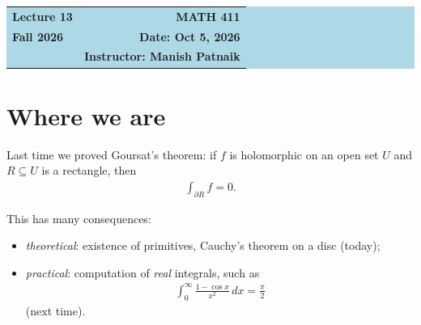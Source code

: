 \documentclass[11pt]{article}
\theoremstyle{plain}
\theoremstyle{definition}
\theoremstyle{remark}
\numberwithin{equation}{section}
\newcommand{\be}{\begin{eqnarray}}
\newcommand{\ee}{\end{eqnarray}}
\begin{document}
\begin{center}
  \colorbox{lightblue}{%
    \begin{minipage}{0.94\textwidth}
      \vspace{0.55em}
      \begin{tabular*}{\textwidth}{@{\extracolsep{\fill}}lr}
        {\color{courseblue}\bfseries\LARGE Lecture 13} &
        {\color{courseblue}\bfseries\LARGE MATH 411}\\[0.35em]
        \textbf{Fall 2026} & \textbf{Date: Oct 5, 2026}\\
        & \textbf{Instructor: Manish Patnaik}
      \end{tabular*}
      \vspace{0.45em}
    \end{minipage}}
\end{center}

\setcounter{tocdepth}{1}
\tableofcontents
\vspace{0.45em}

\section{Where we are}
\noindent
\begin{minipage}[c]{0.6\textwidth}
Last time we proved Goursat's theorem: if $f$ is holomorphic on an open set
$U$ and $R\subseteq U$ is a rectangle, then
\be
 \int_{\partial R}f=0.
\ee
\end{minipage}\hfill
\begin{minipage}[c]{0.36\textwidth}
\centering
{}
\end{minipage}

This has many consequences:
\begin{itemize}
  \item \emph{theoretical}: existence of primitives, Cauchy's theorem on a
  disc (today);
  \item \emph{practical}: computation of \emph{real} integrals, such as
  \be
   \int_0^\infty\frac{1-\cos x}{x^2}\,dx=\frac\pi2
  \ee
  (next time).
\end{itemize}
\end{document}
